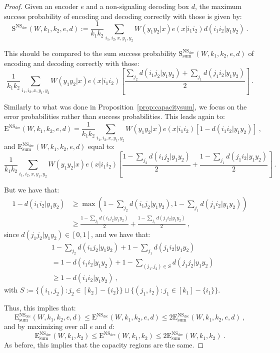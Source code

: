 \begin{proof}
  Given an encoder $e$ and a non-signaling decoding box $d$, the maximum success probability of encoding and decoding correctly with those is given by:
\[ \mathrm{S}^{\mathrm{NS}_{\text{dec}}}(W,k_1,k_2,e,d) := \frac{1}{k_1k_2}\sum_{i_1,i_2,x,y_1,y_2} W(y_1y_2|x)e(x|i_1i_2)d(i_1i_2|y_1y_2) \ . \]

This should be compared to the sum success probability $\mathrm{S}_{\text{sum}}^{\mathrm{NS}_{\text{dec}}}(W,k_1,k_2,e,d)$ of encoding and decoding correctly with those:
\[ \frac{1}{k_1k_2}\sum_{i_1,i_2,x,y_1,y_2} W(y_1y_2|x)e(x|i_1i_2)\left[\frac{\sum_{j_2}d(i_1j_2|y_1y_2)+\sum_{j_1}d(j_1i_2|y_1y_2)}{2}\right] \ . \]

Similarly to what was done in Proposition~\ref{prop:capacitysum}, we focus on the error probabilities rather than success probabilities. This leads again to:
\[ \mathrm{E}^{\mathrm{NS}_{\text{dec}}}(W,k_1,k_2,e,d) = \frac{1}{k_1k_2}\sum_{i_1,i_2,x,y_1,y_2} W(y_1y_2|x)e(x|i_1i_2)\left[1-d(i_1i_2|y_1y_2)\right] \ , \]
and $\mathrm{E}_{\text{sum}}^{\mathrm{NS}_{\text{dec}}}(W,k_1,k_2,e,d)$ equal to:
\[ \frac{1}{k_1k_2}\sum_{i_1,i_2,x,y_1,y_2} W(y_1y_2|x)e(x|i_1i_2)\left[\frac{1-\sum_{j_2}d(i_1j_2|y_1y_2)}{2}+\frac{1-\sum_{j_1}d(j_1i_2|y_1y_2)}{2}\right] \ . \]

But we have that:
\begin{equation}
  \begin{aligned}
    1-d(i_1i_2|y_1y_2) &\geq \max\left(1-\sum_{j_2}d(i_1j_2|y_1y_2),1-\sum_{j_1}d(j_1i_2|y_1y_2)\right)\\
    &\geq \frac{1-\sum_{j_2}d(i_1j_2|y_1y_2)}{2}+\frac{1-\sum_{j_1}d(j_1i_2|y_1y_2)}{2} \ ,
  \end{aligned}
\end{equation}
since $d(j_1j_2|y_1y_2) \in [0,1]$, and we have that: 
\begin{equation}
  \begin{aligned}
    &1-\sum_{j_2}d(i_1j_2|y_1y_2)+1-\sum_{j_1}d(j_1i_2|y_1y_2)\\
    &= 1-d(i_1i_2|y_1y_2) + 1-\sum_{(j_1,j_2) \in S}d(j_1j_2|y_1y_2)\\
    &\geq 1-d(i_1i_2|y_1y_2) \ ,
  \end{aligned}
\end{equation}
with $S := \{(i_1,j_2): j_2 \in [k_2]-\{i_2\}\} \sqcup \{(j_1,i_2): j_1 \in [k_1]-\{i_1\}\}$.

Thus, this implies that:
\[\mathrm{E}_{\text{sum}}^{\mathrm{NS}_{\text{dec}}}(W,k_1,k_2,e,d) \leq \mathrm{E}^{\mathrm{NS}_{\text{dec}}}(W,k_1,k_2,e,d) \leq 2\mathrm{E}_{\text{sum}}^{\mathrm{NS}_{\text{dec}}}(W,k_1,k_2,e,d) \ ,\]
and by maximizing over all $e$ and $d$:
\[\mathrm{E}_{\text{sum}}^{\mathrm{NS}_{\text{dec}}}(W,k_1,k_2) \leq \mathrm{E}^{\mathrm{NS}_{\text{dec}}}(W,k_1,k_2) \leq 2\mathrm{E}_{\text{sum}}^{\mathrm{NS}_{\text{dec}}}(W,k_1,k_2) \ .\]
As before, this implies that the capacity regions are the same.
\end{proof}

